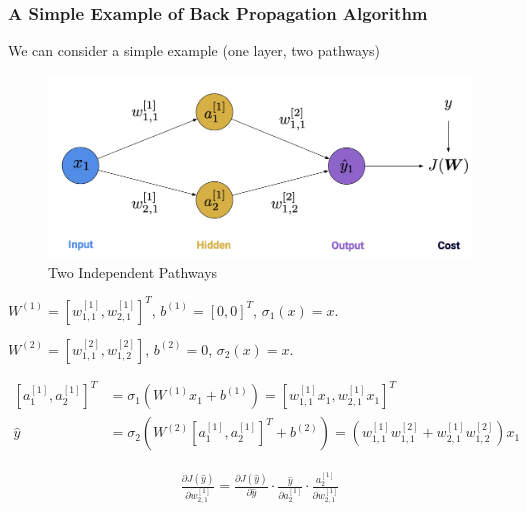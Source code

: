 \documentclass[11pt,a4paper]{article}
\begin{document}
\subsubsection{A Simple Example of Back Propagation Algorithm}
We can consider a simple example (one layer, two pathways)
\begin{center}\begin{figure}[htbp]
    \centering
    \includegraphics[scale=0.2]{2path.png}
    \caption{Two Independent Pathways}
    \label{}
\end{figure}\end{center}
$W^{(1)}=[w_{1,1}^{[1]},w_{2,1}^{[1]}]^T$, $b^{(1)}=[0,0]^T$, $\sigma_1(x)=x$.

$W^{(2)}=[w_{1,1}^{[2]},w_{1,2}^{[2]}]$, $b^{(2)}=0$, $\sigma_2(x)=x$.

\begin{equation}
    \begin{aligned}
        [a_1^{[1]},a_2^{[1]}]^T&=\sigma_1(W^{(1)}x_1+b^{(1)})=[w_{1,1}^{[1]}x_1,w_{2,1}^{[1]}x_1]^T\\
        \hat{y}&=\sigma_2(W^{(2)}[a_1^{[1]},a_2^{[1]}]^T+b^{(2)})=(w_{1,1}^{[1]}w_{1,1}^{[2]}+w_{2,1}^{[1]}w_{1,2}^{[2]})x_1
    \end{aligned}
    \nonumber
\end{equation}

\begin{equation}
    \begin{aligned}
        \frac{\partial J(\hat{y})}{\partial w_{2,1}^{[1]}}=\frac{\partial J(\hat{y})}{\partial \hat{y}}\cdot \frac{\hat{y}}{\partial a_2^{[1]}}\cdot\frac{a_2^{[1]}}{\partial w_{2,1}^{[1]}}
    \end{aligned}
    \nonumber
\end{equation}
\end{document}
